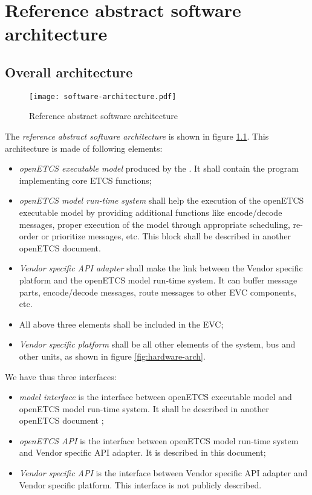 \chapter{Reference abstract software architecture}
\label{software-arch}

\section{Overall architecture}

\begin{figure}[htbp]
  \centering
  \texttt{[image: software-architecture.pdf]}
  \caption{Reference abstract software architecture}
  \label{fig:software-arch}
\end{figure}

The \emph{reference abstract software architecture} is shown in figure
\ref{fig:software-arch}. This architecture is made of following
elements:
\begin{itemize}
\item \emph{openETCS executable model} produced by the
  \cite{scade-model}. It shall contain the program implementing core
  ETCS functions;
\item \emph{openETCS model run-time system} shall help the execution
  of the openETCS executable model by providing additional functions
  like encode/decode messages, proper execution of the model through
  appropriate scheduling, re-order or prioritize messages, etc. This
  block shall be described in another openETCS document. 
\item \emph{Vendor specific API adapter} shall make the link between
  the Vendor specific platform and the openETCS model run-time system.
  It can buffer message parts, encode/decode messages, route messages
  to other EVC components, etc.
\item All above three elements shall be included in the EVC;
\item \emph{Vendor specific platform} shall be all other elements of
  the system, bus and other units, as shown in figure
  \ref{fig:hardware-arch}.
\end{itemize}

We have thus three interfaces:
\begin{itemize}
\item \emph{model interface} is the interface between openETCS
  executable model and openETCS model run-time system. It shall be
  described in another openETCS document ;
\item \emph{openETCS API} is the interface between openETCS model
  run-time system and Vendor specific API adapter. It is described in
  this document;
\item \emph{Vendor specific API} is the interface between Vendor
  specific API adapter and Vendor specific platform. This interface is
  not publicly described.
\end{itemize}

